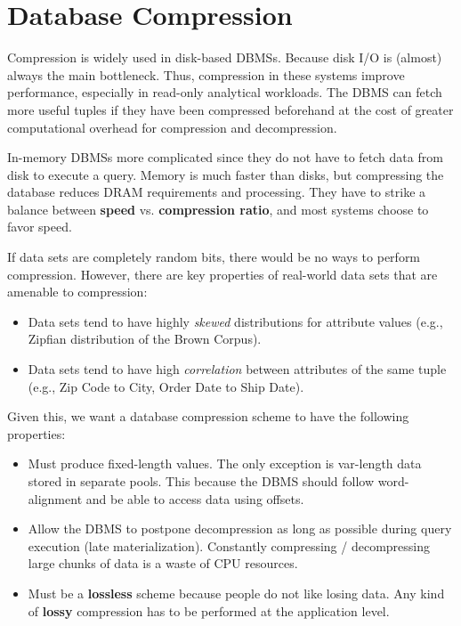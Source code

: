 \documentclass[11pt]{article}
\begin{document}
\maketitle
\thispagestyle{plain}

\section{Database Compression}
Compression is widely used in disk-based DBMSs. Because disk I/O is (almost) always the main bottleneck. Thus, compression in these systems improve performance, especially in read-only analytical workloads. The DBMS can fetch more useful tuples if they have been compressed beforehand at the cost of greater computational overhead for compression and decompression.

In-memory DBMSs more complicated since they do not have to fetch data from disk to execute a query. Memory is much faster than disks, but compressing the database reduces DRAM requirements and processing. They have to strike a balance between \textbf{speed} vs. \textbf{compression ratio}, and most systems choose to favor speed.

If data sets are completely random bits, there would be no ways to perform compression. However, there are key properties of real-world data sets that are amenable to compression:
\begin{itemize}
    \item
    Data sets tend to have highly \textit{skewed} distributions for attribute values (e.g., Zipfian distribution of the Brown Corpus).
    
    \item
    Data sets tend to have high \textit{correlation} between attributes of the same 
    tuple (e.g., Zip Code to City, Order Date to Ship Date).
\end{itemize}

Given this, we want a database compression scheme to have the following properties:
\begin{itemize}
    \item
    Must produce fixed-length values. The only exception is var-length data stored in separate pools. This because the DBMS should follow word-alignment and be able to access data using offsets.
    
    \item
    Allow the DBMS to postpone decompression as long as possible during query execution (late materialization). Constantly compressing / decompressing large chunks of data is a waste of CPU resources.
    
    \item
    Must be a \textbf{lossless} scheme because people do not like losing data. 
    Any kind of \textbf{lossy} compression has to be performed at the application level.
\end{itemize}
\end{document}
